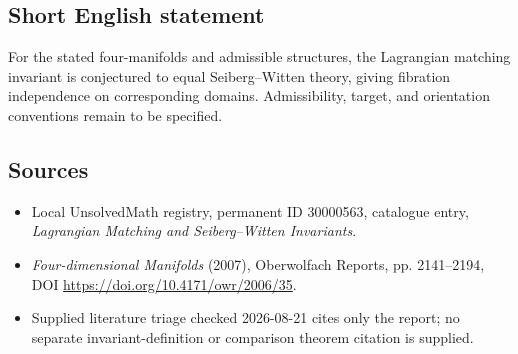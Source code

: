 \documentclass[11pt]{article}
\begin{document}
\subsection{Short English statement}
For the stated four-manifolds and admissible structures, the Lagrangian matching invariant is conjectured to equal Seiberg--Witten theory, giving fibration independence on corresponding domains. Admissibility, target, and orientation conventions remain to be specified.
\subsection{Sources}
\begin{itemize}
\item Local UnsolvedMath registry, permanent ID 30000563, catalogue entry, \emph{Lagrangian Matching and Seiberg--Witten Invariants}.
\item \emph{Four-dimensional Manifolds} (2007), Oberwolfach Reports, pp. 2141--2194, DOI \url{https://doi.org/10.4171/owr/2006/35}.
\item Supplied literature triage checked 2026-08-21 cites only the report; no separate invariant-definition or comparison theorem citation is supplied.
\end{itemize}
\end{document}
